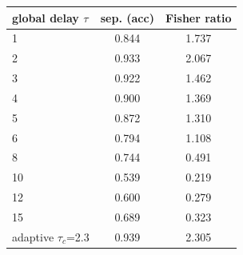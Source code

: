 \begin{tabular}{lcc}
\toprule
global delay $\tau$ & sep. (acc) & Fisher ratio \\
\midrule
1 & 0.844 & 1.737 \\
2 & 0.933 & 2.067 \\
3 & 0.922 & 1.462 \\
4 & 0.900 & 1.369 \\
5 & 0.872 & 1.310 \\
6 & 0.794 & 1.108 \\
8 & 0.744 & 0.491 \\
10 & 0.539 & 0.219 \\
12 & 0.600 & 0.279 \\
15 & 0.689 & 0.323 \\
adaptive $\tau_c$=2.3 & 0.939 & 2.305 \\
\bottomrule
\end{tabular}
